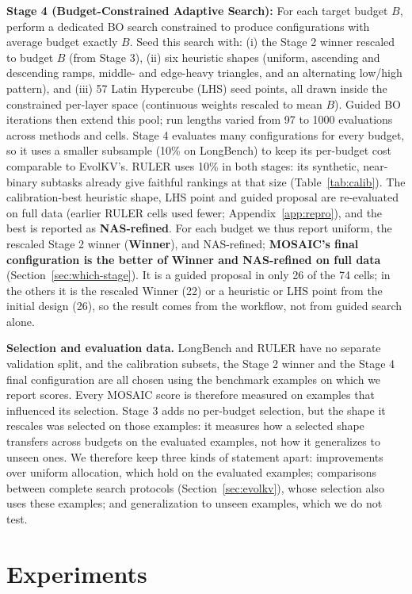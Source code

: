 \documentclass[11pt]{article}
\begin{document}
\textbf{Stage 4 (Budget-Constrained Adaptive Search):} For each target budget $B$, perform a dedicated BO search constrained to produce configurations with average budget exactly $B$. Seed this search with: (i) the Stage 2 winner rescaled to budget $B$ (from Stage 3), (ii) six heuristic shapes (uniform, ascending and descending ramps, middle- and edge-heavy triangles, and an alternating low/high pattern), and (iii) 57 Latin Hypercube (LHS) seed points, all drawn inside the constrained per-layer space (continuous weights rescaled to mean $B$). Guided BO iterations then extend this pool; run lengths varied from 97 to 1000 evaluations across methods and cells. Stage 4 evaluates many configurations for every budget, so it uses a smaller subsample (10\% on LongBench) to keep its per-budget cost comparable to EvolKV's. RULER uses 10\% in both stages: its synthetic, near-binary subtasks already give faithful rankings at that size (Table~\ref{tab:calib}). The calibration-best heuristic shape, LHS point and guided proposal are re-evaluated on full data (earlier RULER cells used fewer; Appendix~\ref{app:repro}), and the best is reported as \textbf{NAS-refined}. For each budget we thus report uniform, the rescaled Stage 2 winner (\textbf{Winner}), and NAS-refined; \textbf{MOSAIC's final configuration is the better of Winner and NAS-refined on full data} (Section~\ref{sec:which-stage}). It is a guided proposal in only 26 of the 74 cells; in the others it is the rescaled Winner (22) or a heuristic or LHS point from the initial design (26), so the result comes from the workflow, not from guided search alone.

\textbf{Selection and evaluation data.} LongBench and RULER have no separate validation split, and the calibration subsets, the Stage 2 winner and the Stage 4 final configuration are all chosen using the benchmark examples on which we report scores. Every MOSAIC score is therefore measured on examples that influenced its selection. Stage 3 adds no per-budget selection, but the shape it rescales was selected on those examples: it measures how a selected shape transfers across budgets on the evaluated examples, not how it generalizes to unseen ones. We therefore keep three kinds of statement apart: improvements over uniform allocation, which hold on the evaluated examples; comparisons between complete search protocols (Section~\ref{sec:evolkv}), whose selection also uses these examples; and generalization to unseen examples, which we do not test.


\section{Experiments}
\end{document}
